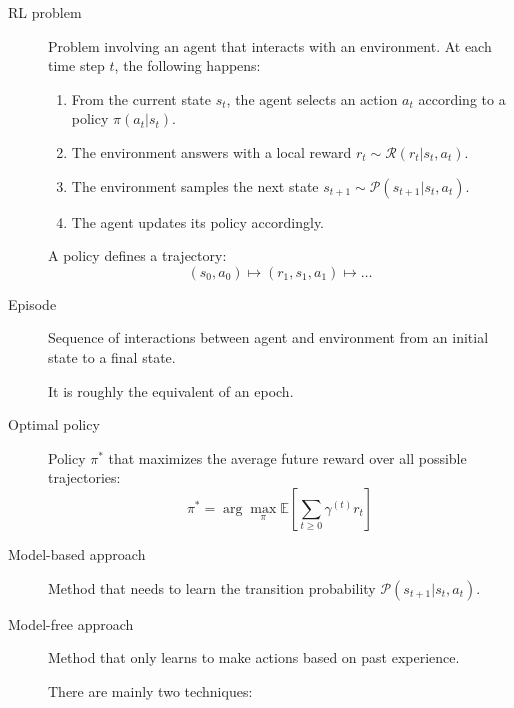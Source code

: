 \begin{description}
    \item[RL problem] 
        Problem involving an agent that interacts with an environment.
        At each time step $t$, the following happens:
        \begin{enumerate}
            \item From the current state $s_t$, the agent selects an action $a_t$ according to a policy $\pi(a_t | s_t)$.
            \item The environment answers with a local reward $r_t \sim \mathcal{R}(r_t | s_t, a_t)$.
            \item The environment samples the next state $s_{t+1} \sim \mathcal{P}(s_{t+1} | s_t, a_t)$.
            \item The agent updates its policy accordingly.
        \end{enumerate}

        \begin{remark}
            A policy defines a trajectory:
            \[ (s_0, a_0) \mapsto (r_1, s_1, a_1) \mapsto \dots \]
        \end{remark}

    \item[Episode] 
        Sequence of interactions between agent and environment from an initial state to a final state.

        \begin{remark}
            It is roughly the equivalent of an epoch.
        \end{remark}

    \item[Optimal policy] 
        Policy $\pi^*$ that maximizes the average future reward over all possible trajectories:
        \[ \pi^* = \arg\max_\pi \mathbb{E}\left[ \sum_{t \geq 0} \gamma^{(t)} r_t \right] \]

    \item[Model-based approach] 
        Method that needs to learn the transition probability $\mathcal{P}(s_{t+1} | s_t, a_t)$.

    \item[Model-free approach] 
        Method that only learns to make actions based on past experience.

        There are mainly two techniques:
\end{description}



